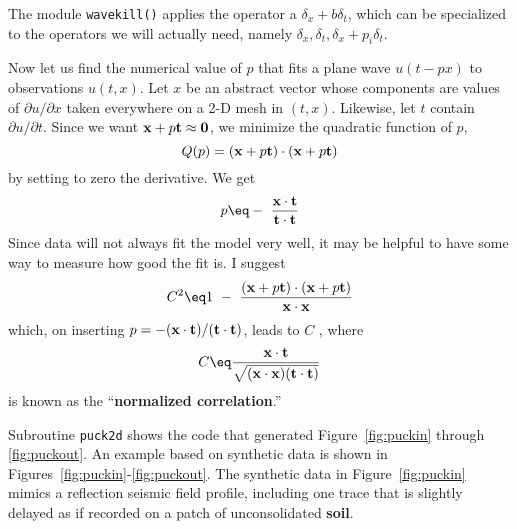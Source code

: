 \par
The module {\tt wavekill()}  applies the operator a $\delta_x + b \delta_t$, which can be specialized to the operators we will actually need, namely $\delta_x, \delta_t, \delta_x+p_i\delta_t$. 
\par
Now let us find the numerical value of $p$ that fits a plane wave $u(t-px)$ to  observations $u (t , x )$. Let $x$ be an abstract vector whose components are values of $\partial u /\partial x$ taken everywhere on a 2-D mesh in $(t,x)$. Likewise, let $t$ contain $\partial u /\partial t$.  Since we want ${\bf x} + p {\bf t} \approx {\bf 0}$, we minimize the quadratic function of $p$, 
\begin{equation}
Q( p) = ({\bf x} + p {\bf t}) \cdot ({\bf x} + p {\bf t}) 
\end{equation}
by setting to zero the derivative. We get 
\begin{equation}
p \eq - \ \frac{ {\bf x} \cdot {\bf t} }{ {\bf t} \cdot {\bf t} } 
\end{equation}
Since data will not always fit the model very well, it may be helpful to have some way to measure how good the fit is. I suggest
\begin{equation}
C^2 \eq 1 \ -\  \frac{ ({\bf x} + p {\bf t}) \cdot ({\bf x} + p {\bf t}) }{ {\bf x} \cdot {\bf x}} 
\end{equation}
which, on inserting $p=-({\bf x} \cdot {\bf t})/({\bf t} \cdot {\bf t})$, leads to $C$ , where 
\begin{equation}
C \eq \frac{ {\bf x} \cdot {\bf t} } { \sqrt{ ( {\bf x} \cdot {\bf x} ) ( {\bf t}\cdot{\bf t}) }}
\end{equation} 
is known as the ``{\bf normalized correlation}.''   






Subroutine {\tt puck2d} shows the code that generated
Figure~\ref{fig:puckin} through \ref{fig:puckout}.
An example based on synthetic data is shown
in Figures~\ref{fig:puckin}-\ref{fig:puckout}.
The synthetic data in Figure~\ref{fig:puckin} mimics
a reflection seismic field profile,
including one trace that is slightly delayed
as if recorded on a patch of unconsolidated {\bf soil}. 

